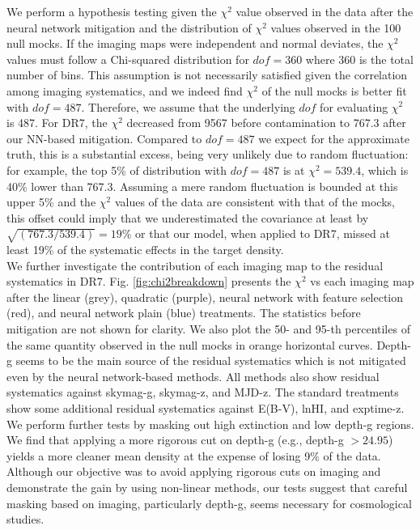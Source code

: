 We perform a hypothesis testing given the $\chi^{2}$ value observed in the data after the neural network mitigation and the distribution of $\chi^{2}$ values observed in the 100 null mocks.
If the imaging maps were independent and normal deviates, the $\chi^{2}$ values must follow a Chi-squared distribution for $dof=360$ where 360 is the total number of bins. This assumption is not necessarily satisfied given the correlation among imaging systematics, and we indeed find $\chi^{2}$ of the null mocks is better fit with $dof=487$. Therefore, we assume that the underlying $dof$ for evaluating $\chi^2$ is 487. For DR7, the $\chi^2$ decreased from 9567 before contamination to 767.3 after our NN-based mitigation. Compared to $dof=487$ we expect for the approximate truth, this is a substantial excess, being very unlikely due to random fluctuation: for example, the top 5\% of distribution with $dof=487$ is at $\chi^2 = 539.4$, which is 40\% lower than 767.3. Assuming a mere random fluctuation is bounded at this upper 5\% and the $\chi^{2}$ values of the data are consistent with that of the mocks, this offset could imply that we underestimated the covariance at least by $\sqrt{(767.3/539.4)} = 19\%$ or that our model, when applied to DR7, missed at least 19\% of the systematic effects in the target density.\\

We further investigate the contribution of each imaging map to the residual systematics in DR7. Fig. \ref{fig:chi2breakdown} presents the $\chi^{2}$ vs each imaging map after the linear (grey), quadratic (purple), neural network with feature selection (red), and neural network plain (blue) treatments. The statistics before mitigation are not shown for clarity. We also plot the 50- and 95-th percentiles of the same quantity observed in the null mocks in orange horizontal curves. Depth-g seems to be the main source of the residual systematics which is not mitigated even by the neural network-based methods. All methods also show residual systematics against skymag-g, skymag-z, and MJD-z. The standard treatments show some additional residual systematics against E(B-V), lnHI, and exptime-z. We perform further tests by masking out high extinction and low depth-g regions. We find that applying a more rigorous cut on depth-g (e.g., depth-g $> 24.95$) yields a more cleaner mean density at the expense of losing 9\% of the data. Although our objective was to avoid applying rigorous cuts on imaging and demonstrate the gain by using non-linear methods, our tests suggest that careful masking based on imaging, particularly depth-g, seems necessary for cosmological studies. \\


